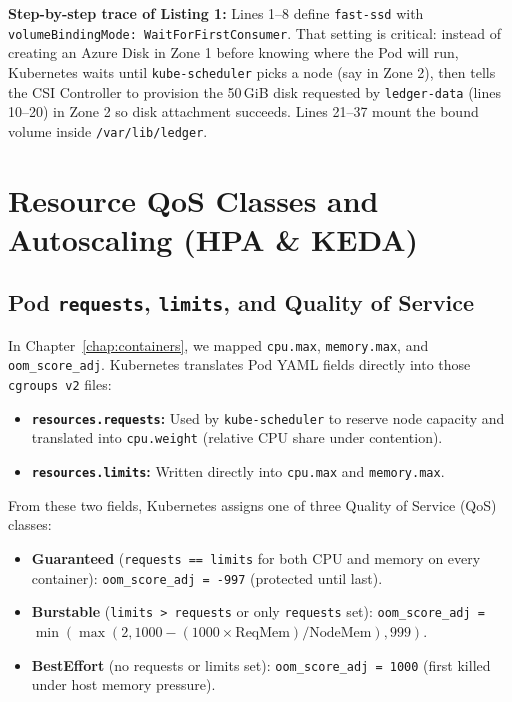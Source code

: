 \textbf{Step-by-step trace of Listing 1:} Lines 1--8 define \texttt{fast-ssd} with \texttt{volumeBindingMode: WaitForFirstConsumer}. That setting is critical: instead of creating an Azure Disk in Zone 1 before knowing where the Pod will run, Kubernetes waits until \texttt{kube-scheduler} picks a node (say in Zone 2), then tells the CSI Controller to provision the 50\,GiB disk requested by \texttt{ledger-data} (lines 10--20) in Zone 2 so disk attachment succeeds. Lines 21--37 mount the bound volume inside \texttt{/var/lib/ledger}.

\section{Resource QoS Classes and Autoscaling (HPA \protect\& KEDA)}

\subsection{Pod \texttt{requests}, \texttt{limits}, and Quality of Service}
In Chapter~\ref{chap:containers}, we mapped \texttt{cpu.max}, \texttt{memory.max}, and \texttt{oom\_score\_adj}. Kubernetes translates Pod YAML fields directly into those \texttt{cgroups v2} files:
\begin{itemize}[leftmargin=12pt]
  \item \textbf{\texttt{resources.requests}:} Used by \texttt{kube-scheduler} to reserve node capacity and translated into \texttt{cpu.weight} (relative CPU share under contention).
  \item \textbf{\texttt{resources.limits}:} Written directly into \texttt{cpu.max} and \texttt{memory.max}.
\end{itemize}
From these two fields, Kubernetes assigns one of three Quality of Service (QoS) classes:
\begin{itemize}[leftmargin=12pt]
  \item \textbf{Guaranteed} (\texttt{requests == limits} for both CPU and memory on every container): \texttt{oom\_score\_adj = -997} (protected until last).
  \item \textbf{Burstable} (\texttt{limits > requests} or only \texttt{requests} set): \texttt{oom\_score\_adj = $\min(\max(2, 1000 - (1000 \times \text{ReqMem}) / \text{NodeMem}), 999)$}.
  \item \textbf{BestEffort} (no requests or limits set): \texttt{oom\_score\_adj = 1000} (first killed under host memory pressure).
\end{itemize}


